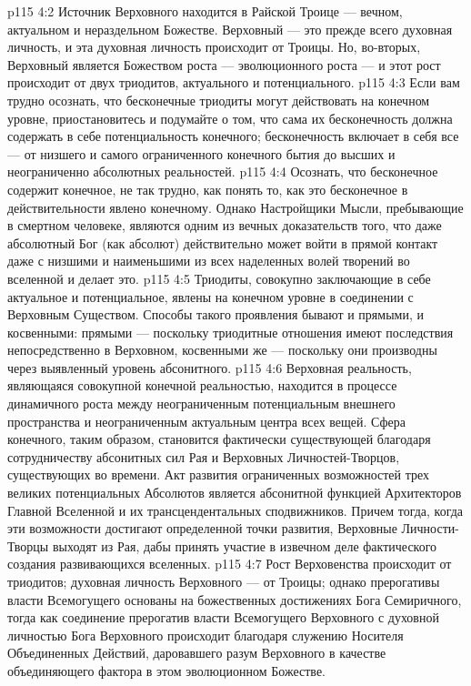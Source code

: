 \vs p115 4:2 Источник Верховного находится в Райской Троице --- вечном, актуальном и нераздельном Божестве. Верховный --- это прежде всего духовная личность, и эта духовная личность происходит от Троицы. Но, во\hyp{}вторых, Верховный является Божеством роста --- эволюционного роста --- и этот рост происходит от двух триодитов, актуального и потенциального.
\vs p115 4:3 Если вам трудно осознать, что бесконечные триодиты могут действовать на конечном уровне, приостановитесь и подумайте о том, что сама их бесконечность должна содержать в себе потенциальность конечного; бесконечность включает в себя все --- от низшего и самого ограниченного конечного бытия до высших и неограниченно абсолютных реальностей.
\vs p115 4:4 Осознать, что бесконечное содержит конечное, не так трудно, как понять то, как это бесконечное в действительности явлено конечному. Однако Настройщики Мысли, пребывающие в смертном человеке, являются одним из вечных доказательств того, что даже абсолютный Бог (как абсолют) действительно может войти в прямой контакт даже с низшими и наименьшими из всех наделенных волей творений во вселенной и делает это.
\vs p115 4:5 Триодиты, совокупно заключающие в себе актуальное и потенциальное, явлены на конечном уровне в соединении с Верховным Существом. Способы такого проявления бывают и прямыми, и косвенными: прямыми --- поскольку триодитные отношения имеют последствия непосредственно в Верховном, косвенными же --- поскольку они производны через выявленный уровень абсонитного.
\vs p115 4:6 Верховная реальность, являющаяся совокупной конечной реальностью, находится в процессе динамичного роста между неограниченным потенциальным внешнего пространства и неограниченным актуальным центра всех вещей. Сфера конечного, таким образом, становится фактически существующей благодаря сотрудничеству абсонитных сил Рая и Верховных Личностей\hyp{}Творцов, существующих во времени. Акт развития ограниченных возможностей трех великих потенциальных Абсолютов является абсонитной функцией Архитекторов Главной Вселенной и их трансцендентальных сподвижников. Причем тогда, когда эти возможности достигают определенной точки развития, Верховные Личности\hyp{}Творцы выходят из Рая, дабы принять участие в извечном деле фактического создания развивающихся вселенных.
\vs p115 4:7 Рост Верховенства происходит от триодитов; духовная личность Верховного --- от Троицы; однако прерогативы власти Всемогущего основаны на божественных достижениях Бога Семиричного, тогда как соединение прерогатив власти Всемогущего Верховного с духовной личностью Бога Верховного происходит благодаря служению Носителя Объединенных Действий, даровавшего разум Верховного в качестве объединяющего фактора в этом эволюционном Божестве.
